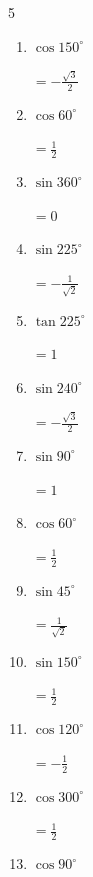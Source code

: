 \begin{multicols}{5}
\begin{enumerate}
        $\displaystyle =-\frac{\sqrt{3}}{2}$

  \item $\displaystyle \cos{150^\circ}$

        $\displaystyle =-\frac{\sqrt{3}}{2}$

  \item $\displaystyle \cos{60^\circ}$

        $\displaystyle =\frac{1}{2}$

  \item $\displaystyle \sin{360^\circ}$

        $\displaystyle =0$

  \item $\displaystyle \sin{225^\circ}$

        $\displaystyle =-\frac{1}{\sqrt{2}}$

  \item $\displaystyle \tan{225^\circ}$

        $\displaystyle =1$

  \item $\displaystyle \sin{240^\circ}$

        $\displaystyle =-\frac{\sqrt{3}}{2}$

  \item $\displaystyle \sin{90^\circ}$

        $\displaystyle =1$

  \item $\displaystyle \cos{60^\circ}$

        $\displaystyle =\frac{1}{2}$

  \item $\displaystyle \sin{45^\circ}$

        $\displaystyle =\frac{1}{\sqrt{2}}$

  \item $\displaystyle \sin{150^\circ}$

        $\displaystyle =\frac{1}{2}$

  \item $\displaystyle \cos{120^\circ}$

        $\displaystyle =-\frac{1}{2}$

  \item $\displaystyle \cos{300^\circ}$

        $\displaystyle =\frac{1}{2}$

\columnbreak %

  \item $\displaystyle \cos{90^\circ}$


\end{enumerate}
\end{multicols}
